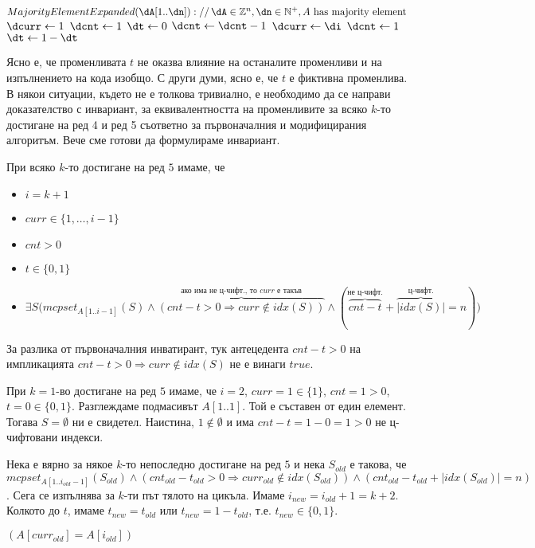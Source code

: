 \begin{solution}
\begin{pseudocode}
		$MajorityElementExpanded(\dA[1..\dn])://\,\dA\in\mathbb{Z}^n,\dn\in\mathbb{N}^+,A\text{ has majority element}$
		\Mybegin
		{	
			$\dcurr\leftarrow1$\;
			$\dcnt\leftarrow1$\;
			\textcolor{mygreen}{$\dt\leftarrow0$\;}
			{
				\Else
				{
					$\dcnt\leftarrow\dcnt-1$\;
					{
						$\dcurr\leftarrow\di$\;
						$\dcnt\leftarrow1$\;
						\textcolor{mygreen}{$\dt\leftarrow1-\dt$\;}
					}
				}
			}
			\KwRet{$\dA[\dcurr]$\;}
		}
	\end{pseudocode}
	Ясно е, че променливата $t$ не оказва влияние на останалите променливи и на изпълнението на кода изобщо. С други думи, ясно е, че $t$ е фиктивна променлива. В някои ситуации, където не е толкова тривиално, е необходимо да се направи доказателство с инвариант, за еквивалентността на променливите за всяко $k$-то достигане на ред 4 и ред 5 съответно за първоначалния и модифицирания алгоритъм. Вече сме готови да формулираме инвариант.
		\begin{boxinvariant*}{}{}
		При всяко $k$-то достигане на ред $5$ имаме, че
		\begin{itemize}
			\item $i=k+1$
			\item $curr\in\{1,\dots,i-1\}$
			\item $cnt>0$
			\item $t\in\{0,1\}$
			\vspace{-0.5cm}
			\item $\exists S\big(mcpset_{A[1..i-1]}(S)\!\land\!\overbrace{(cnt-t>0\!\Rightarrow\! curr\!\notin\! idx(S))}^{\text{ако има не ц-чифт., то }curr\text{ е такъв}}\!\land(\overbrace{cnt-t}^{\text{не ц-чифт.}}\!+\!\overbrace{|idx(S)|}^{\text{ц-чифт.}}\!=\!n)\big)$
		\end{itemize}
	\end{boxinvariant*}
	\begin{remark*}
		За разлика от първоначалния инватирант, тук антецедента $cnt-t>0$ на импликацията $cnt-t>0\Rightarrow curr\notin idx(S)$ не е винаги $true$.
	\end{remark*}
	\begin{base}
		При $k\!=\!1$-во достигане на ред $5$ имаме, че $i\!=\!2$, $curr\!=\!1\!\in\!\{1\}$, $cnt\!=\!1\!>\!0$, $t\!=\!0\!\in\!\{0,1\}$. Разглеждаме подмасивът $A[1..1]$. Той е съставен от един елемент. Тогава $S=\emptyset$ ни е свидетел. Наистина, $1\!\notin\!\emptyset$ и има $cnt\!-\!t\!=\!1\!-\!0\!=\!1\!>\!0$ не ц-чифтовани индекси. 
	\end{base}
	\begin{maintenance}
		Нека е вярно за някое $k$-то непоследно достигане на ред $5$ и нека $S_{old}$ е такова, че $mcpset_{A[1..i_{old}-1]}(S_{old})\land(cnt_{old}-t_{old}>0\Rightarrow curr_{old}\notin idx(S_{old}))\land(cnt_{old}-t_{old}+|idx(S_{old})|=n)$. Сега се изпълнява за $k$-ти път тялото на цикъла. Имаме $i_{new}=i_{old}\!+\!1=k\!+\!2$. Колкото до $t$, имаме $t_{new}=t_{old}$ или $t_{new}=1-t_{old}$, т.е. $t_{new}\in\{0,1\}$.
		\begin{mycase}
			\item $(A[curr_{old}]=A[i_{old}])$
			

\end{mycase}
\end{maintenance}
\end{solution}
